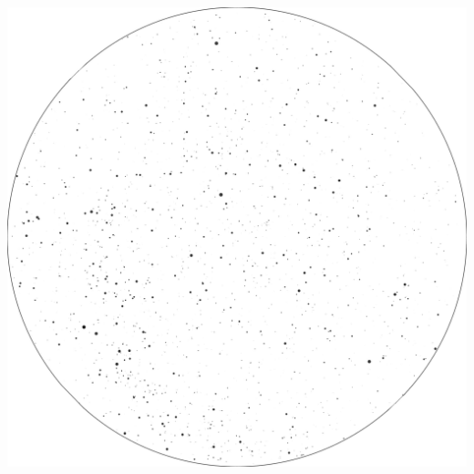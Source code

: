 \documentclass{./SAS-class-skygen}
\begin{document}
	\vspace{0.5cm}
    \begin{center}
    \includegraphics[width=\textwidth]{./pics/skychart47.png}
    \end{center}
    
    
\end{document}
